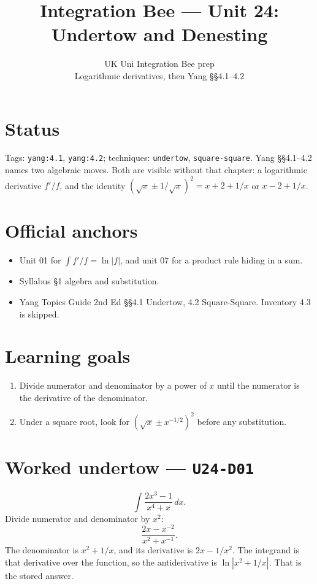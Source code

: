 
\title{Integration Bee --- Unit 24:\\ Undertow and Denesting}
\author{UK Uni Integration Bee prep\\ Logarithmic derivatives, then Yang \S\S4.1--4.2}
\date{}

\maketitle
\section*{Status}
Tags: \texttt{yang:4.1}, \texttt{yang:4.2}; techniques: \texttt{undertow}, \texttt{square-square}.
Yang \S\S4.1--4.2 names two algebraic moves. Both are visible without that chapter: a logarithmic derivative $f'/f$, and the identity $(\sqrt{x}\pm 1/\sqrt{x})^2=x+2+1/x$ or $x-2+1/x$.
\section{Official anchors}
\begin{itemize}
\item Unit 01 for $\int f'/f=\ln|f|$, and unit 07 for a product rule hiding in a sum.
\item Syllabus \S1 algebra and substitution.
\item Yang Topics Guide 2nd Ed \S\S4.1 Undertow, 4.2 Square-Square. Inventory 4.3 is skipped.
\end{itemize}
\section{Learning goals}
\begin{enumerate}
  \item Divide numerator and denominator by a power of $x$ until the numerator is the derivative of the denominator.
  \item Under a square root, look for $(\sqrt{x}\pm x^{-1/2})^2$ before any substitution.
\end{enumerate}

\section{Worked undertow --- \texttt{U24-D01}}
\[
\int\frac{2x^3-1}{x^4+x}\,dx.
\]
Divide numerator and denominator by $x^2$:
\[
\frac{2x-x^{-2}}{x^2+x^{-1}}.
\]
The denominator is $x^2+1/x$, and its derivative is $2x-1/x^2$. The integrand is that derivative over the function, so the antiderivative is $\ln|x^2+1/x|$. That is the stored answer.

